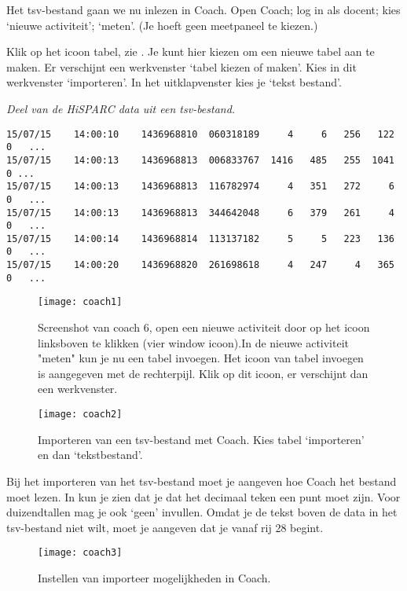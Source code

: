 Het tsv-bestand gaan we nu inlezen in Coach. Open Coach; log in als docent; kies `nieuwe activiteit';
`meten'. (Je hoeft geen meetpaneel te kiezen.)

Klik op het icoon tabel, zie . Je kunt hier kiezen om een
nieuwe tabel aan te maken. Er verschijnt een werkvenster `tabel kiezen of maken'.
Kies in dit werkvenster `importeren'. In het uitklapvenster kies je `tekst bestand'.

\textit{Deel van de HiSPARC data uit een tsv-bestand.}
\begin{verbatim}
15/07/15	14:00:10	1436968810	060318189     4	    6	256	  122	0	...
15/07/15	14:00:13	1436968813	006833767  1416	  485	255	 1041 0 ...
15/07/15	14:00:13	1436968813	116782974     4	  351	272	    6	0	...
15/07/15	14:00:13	1436968813	344642048     6	  379	261	    4	0	...
15/07/15	14:00:14	1436968814	113137182     5	    5	223	  136	0	...
15/07/15	14:00:20	1436968820	261698618     4	  247	  4	  365	0	...
\end{verbatim}

\begin{figure}
    \centering
    \texttt{[image: coach1]}
    \caption{Screenshot van coach 6, open een nieuwe activiteit door op
    het icoon linksboven te klikken (vier window icoon).In de nieuwe activiteit
    "meten" kun je nu een tabel invoegen. Het icoon van tabel invoegen is
    aangegeven met de rechterpijl. Klik op dit icoon, er verschijnt dan een werkvenster.}
    \label{fig:coach1}
\end{figure}

\begin{figure}
    \centering
    \texttt{[image: coach2]}
    \caption{Importeren van een tsv-bestand met Coach. Kies tabel `importeren' en
    dan `tekstbestand'.}
    \label{fig:coach2}
\end{figure}

Bij het importeren van het tsv-bestand moet je aangeven hoe Coach het bestand moet
lezen. In  kun je zien dat je dat het decimaal teken
een punt moet zijn. Voor duizendtallen mag je ook `geen' invullen. Omdat je de tekst
boven de data in het tsv-bestand niet wilt, moet je aangeven dat je vanaf rij
28 begint.

\begin{figure}
    \centering
    \texttt{[image: coach3]}
    \caption{Instellen van importeer mogelijkheden in Coach.}
    \label{fig:coach3}
\end{figure}

